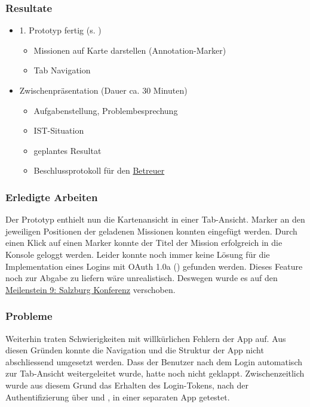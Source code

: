 \subsubsection{Resultate}
\begin{itemize}
	\item 1. Prototyp fertig (s. )
	\begin{itemize}
		\item Missionen auf Karte darstellen (Annotation-Marker)
		\item Tab Navigation
	\end{itemize}
	\item Zwischenpräsentation (Dauer ca. 30 Minuten)
	\begin{itemize}
		\item Aufgabenstellung, Problembesprechung
		\item IST-Situation
		\item geplantes Resultat
		\item Beschlussprotokoll für den \hyperref[pm-rollen]{Betreuer}
	\end{itemize}
\end{itemize}

\subsubsection{Erledigte Arbeiten}
Der Prototyp enthielt nun die Kartenansicht in einer Tab-Ansicht. 
Marker an den jeweiligen Positionen der geladenen Missionen konnten eingefügt werden.
Durch einen Klick auf einen Marker konnte der Titel der Mission erfolgreich in die Konsole geloggt werden.
Leider konnte noch immer keine Lösung für die Implementation eines Logins mit \gls{OAuth} 1.0a () gefunden werden.
Dieses Feature noch zur Abgabe zu liefern wäre unrealistisch.
Deswegen wurde es auf den \hyperref[pm-ms9]{Meilenstein 9: Salzburg Konferenz} verschoben.

\subsubsection{Probleme}
Weiterhin traten Schwierigkeiten mit willkürlichen Fehlern der  App auf. 
Aus diesen Gründen konnte die Navigation und die Struktur der App nicht abschliessend umgesetzt werden.
Dass der Benutzer nach dem Login automatisch zur Tab-Ansicht weitergeleitet wurde, hatte noch nicht geklappt.
Zwischenzeitlich wurde aus diesem Grund das Erhalten des Login-Tokens, nach der Authentifizierung über  und , in einer separaten App getestet.



